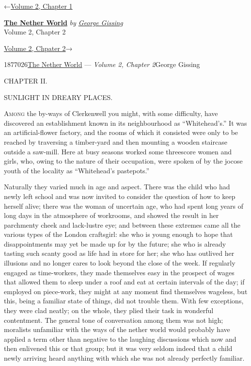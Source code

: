 \hypertarget{headerContainer}{}
\hypertarget{navigationHeader}{}
\protect\hypertarget{headerprevious}{}{←\href{/wiki/The_Nether_World/Volume_2/Chapter_1}{Volume
2, Chapter 1}}

\textbf{\protect\hypertarget{header_title_text}{}{\href{/wiki/The_Nether_World}{The
Nether World}}} \emph{by
\href{/wiki/Author:George_Gissing}{\protect\hypertarget{header_author_text}{}{{George
Gissing}}}}\\
\protect\hypertarget{header_section_text}{}{Volume 2, Chapter 2}

\protect\hypertarget{headernext}{}{\href{/wiki/The_Nether_World/Volume_2/Chapter_3}{Volume
2, Chpater 2}→}

\hypertarget{navigationNotes}{}

\hypertarget{ws-data}{}
\protect\hypertarget{ws-article-id}{}{1877026}\protect\hypertarget{ws-title}{}{\href{/wiki/The_Nether_World}{The
Nether World} --- \emph{Volume 2, Chapter
2}}\protect\hypertarget{ws-author}{}{George Gissing}

{\protect\hypertarget{17}{}{}}

{CHAPTER II.}

SUNLIGHT IN DREARY PLACES.

\textsc{Among} the by-ways of Clerkenwell you might, with some
difficulty, have discovered an establishment known in its neighbourhood
as ``Whitehead's.'' It was an artificial-flower factory, and the rooms
of which it consisted were only to be reached by traversing a
timber-yard and then mounting a wooden staircase outside a saw-mill.
Here at busy seasons worked some threescore women and girls, who, owing
to the nature of their occupation, were spoken of by the jocose youth of
the locality as ``Whitehead's pastepots.''

Naturally they varied much in age and aspect. There was the child who
had newly left school and was now invited to consider the question of
how to keep herself alive; there was the woman of uncertain age, who
{\protect\hypertarget{18}{}{}}had spent long years of long days in the
atmosphere of workrooms, and showed the result in her parchmenty cheek
and lack-lustre eye; and between these extremes came all the various
types of the London craftsgirl: she who is young enough to hope that
disappointments may yet be made up for by the future; she who is already
tasting such scanty good as life had in store for her; she who has
outlived her illusions and no longer cares to look beyond the close of
the week. If regularly engaged as time-workers, they made themselves
easy in the prospect of wages that allowed them to sleep under a roof
and eat at certain intervals of the day; if employed on piece-work, they
might at any moment find themselves wageless, but this, being a familiar
state of things, did not trouble them. With few exceptions, they were
clad neatly; on the whole, they plied their task in wonderful
contentment. The general tone of conversation among them was not high;
moralists unfamiliar with the ways of the nether world would probably
have applied a term other {\protect\hypertarget{19}{}{}}than negative to
the laughing discussions which now and then enlivened this or that
group; but it was very seldom indeed that a child newly arriving heard
anything with which she was not already perfectly familiar.

